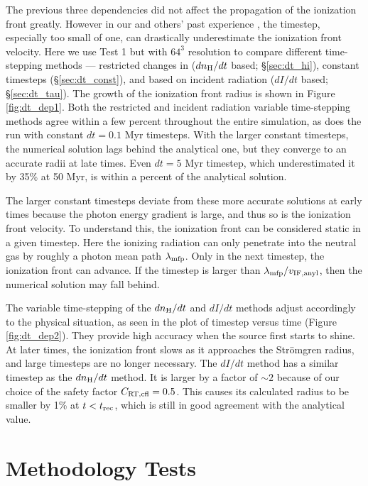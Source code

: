 \documentclass[apj,onecolumn]{emulateapj}
\begin{document}
The previous three dependencies did not affect the propagation of the
ionization front greatly.  However in our and others' past experience
\citep[e.g.]{Shapiro04, Mellema06, Petkova09}, the timestep,
especially too small of one, can drastically underestimate the
ionization front velocity.  Here we use Test 1 but with $64^3$
resolution to compare different time-stepping methods --- restricted
changes in  ($dn_{\rm H}/dt$ based; \S\ref{sec:dt_hi}),
constant timesteps (\S\ref{sec:dt_const}), and based on incident
radiation ($dI/dt$ based; \S\ref{sec:dt_tau}).  The growth of the
ionization front radius is shown in Figure \ref{fig:dt_dep1}.  Both
the  restricted and incident radiation variable time-stepping
methods agree within a few percent throughout the entire simulation,
as does the run with constant $dt = 0.1$ Myr timesteps.  With the
larger constant timesteps, the numerical solution lags behind the
analytical one, but they converge to an accurate  radii at
late times.  Even $dt = 5$ Myr timestep, which underestimated it by
35\% at 50 Myr, is within a percent of the analytical solution.

The larger constant timesteps deviate from these more accurate
solutions at early times because the photon energy gradient is large,
and thus so is the ionization front velocity.  To understand this, the
ionization front can be considered static in a given timestep.  Here
the ionizing radiation can only penetrate into the neutral gas by
roughly a photon mean path $\lambda_{\rm mfp}$.  Only in the next
timestep, the ionization front can advance.  If the timestep is larger
than $\lambda_{\rm mfp} / v_{\rm IF, anyl}$, then the numerical
solution may fall behind.

The variable time-stepping of the $dn_{\rm H}/dt$ and $dI/dt$ methods
adjust accordingly to the physical situation, as seen in the plot of
timestep versus time (Figure \ref{fig:dt_dep2}).  They provide high
accuracy when the source first starts to shine.  At later times, the
ionization front slows as it approaches the Str\"{o}mgren radius, and
large timesteps are no longer necessary.  The $dI/dt$ method has a
similar timestep as the $dn_{\rm H}/dt$ method.  It is larger by a
factor of $\sim 2$ because of our choice of the safety factor $C_{\rm
  RT, cfl} = 0.5$.  This causes its calculated radius to be smaller by
1\% at $t < t_{\rm rec}$, which is still in good agreement with the
analytical value.

\section{Methodology Tests}
\end{document}
